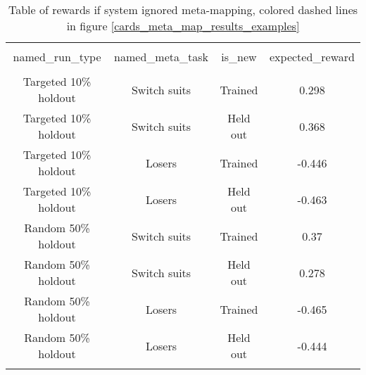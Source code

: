 \begin{table}[H]
\scriptsize
\centering
\begin{tabular}{@{\extracolsep{5pt}} cccc}
\\[-1.8ex]\hline
\hline \\[-1.8ex]
named\_run\_type & named\_meta\_task & is\_new & expected\_reward \\
\hline \\[-1.8ex]
Targeted 10\% holdout & Switch suits & Trained & 0.298 \\
Targeted 10\% holdout & Switch suits & Held out & 0.368 \\
Targeted 10\% holdout & Losers & Trained & -0.446 \\
Targeted 10\% holdout & Losers & Held out & -0.463 \\
Random 50\% holdout & Switch suits & Trained & 0.37 \\
Random 50\% holdout & Switch suits & Held out & 0.278 \\
Random 50\% holdout & Losers & Trained & -0.465 \\
Random 50\% holdout & Losers & Held out & -0.444 \\
\hline \\[-1.8ex]
\end{tabular}
\caption{Table of rewards if system ignored meta-mapping, colored dashed lines in figure \ref{cards_meta_map_results_examples}}
\end{table}

